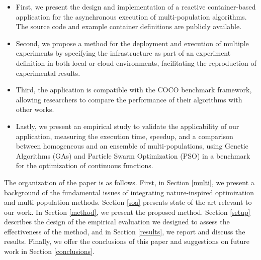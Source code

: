 \documentclass[review]{elsarticle}
\begin{document}
\begin{itemize}
    \item First, we present the design and implementation of a reactive 
    container-based application for the asynchronous execution of multi-population 
    algorithms. The source code and example container definitions are
    publicly available. %
    \item Second, we propose a method for the deployment and execution of 
    multiple experiments by specifying the infrastructure as part of an 
    experiment definition in both local or cloud environments,
    facilitating the reproduction of experimental results. %
    \item Third, the application is compatible with the COCO benchmark 
    framework, allowing researchers to compare the performance of their 
    algorithms with other works. %
    \item Lastly, we present an empirical study to validate the 
    applicability of our application,  measuring the execution time, 
    speedup, and a comparison between homogeneous and an ensemble of 
    multi-populations, using Genetic Algorithms (GAs) and Particle 
    Swarm Optimization (PSO) in a benchmark for the optimization of 
    continuous functions. %
\end{itemize}

The organization of the paper is as follows. First, in Section \ref{multi}, we present a
background of the fundamental issues of integrating nature-inspired optimization
and multi-population methods. Section \ref{soa} presents state of the art relevant to
our work. In Section \ref{method}, we present the proposed method.  Section \ref{setup} describes
the design of the empirical evaluation we designed to assess the effectiveness
of the method, and in Section \ref{results}, we report and discuss the results. Finally, we
offer the conclusions of this paper and suggestions on future work in Section \ref{conclusions}.
\end{document}
